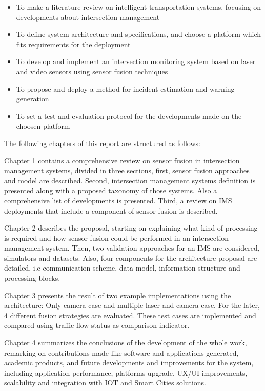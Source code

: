 \begin{itemize}
\item To make a literature review on intelligent transportation systems, focusing on developments about intersection management
\item To define system architecture and specifications, and choose a platform which fits requirements for the deployment
\item To develop and implement an intersection monitoring system based on laser and video sensors using sensor fusion techniques
\item To propose and deploy a method for incident estimation and warning generation
\item To set a test and evaluation protocol for the developments made on the choosen platform 
\end{itemize}


The following chapters of this report are structured as follows:

Chapter 1 contains a comprehensive review on sensor fusion in intersection management systems, divided in three sections, first, sensor fusion approaches and model are described. Second, intersection management systems definition is presented along with a proposed taxonomy of those systems. Also a comprehensive list of developments is presented. Third, a review on IMS deployments that include a component of sensor fusion is described.

Chapter 2 describes the proposal, starting on explaining what kind of processing is required and how sensor fusion could be performed in an intersection management system. Then, two validation approaches for an IMS are considered, simulators and datasets. Also, four components for the architecture proposal are detailed, i.e communication scheme, data model, information structure and processing blocks.

Chapter 3 presents the result of two example implementations using the architecture: Only camera case and multiple laser and camera case. For the later, 4 different fusion strategies are evaluated. These test cases are implemented and compared using traffic flow status as comparison indicator.

Chapter 4 summarizes the conclusions of the development of the whole work, remarking on contributions made like software and applications generated, academic products, and future developments and improvements for the system, including application performance, platforms upgrade, UX/UI improvements, scalability and integration with IOT and Smart Cities solutions.
